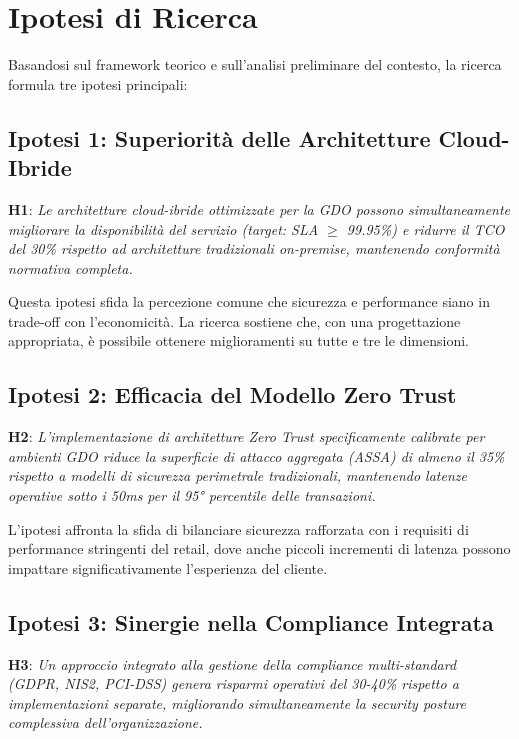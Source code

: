 \section{Ipotesi di Ricerca}

Basandosi sul framework teorico e sull'analisi preliminare del contesto, la ricerca formula tre ipotesi principali:

\subsection{Ipotesi 1: Superiorità delle Architetture Cloud-Ibride}

\textbf{H1}: \textit{Le architetture cloud-ibride ottimizzate per la GDO possono simultaneamente migliorare la disponibilità del servizio (target: SLA $\geq$ 99.95\%) e ridurre il TCO del 30\% rispetto ad architetture tradizionali on-premise, mantenendo conformità normativa completa.}

Questa ipotesi sfida la percezione comune che sicurezza e performance siano in trade-off con l'economicità. La ricerca sostiene che, con una progettazione appropriata, è possibile ottenere miglioramenti su tutte e tre le dimensioni.

\subsection{Ipotesi 2: Efficacia del Modello Zero Trust}

\textbf{H2}: \textit{L'implementazione di architetture Zero Trust specificamente calibrate per ambienti GDO riduce la superficie di attacco aggregata (ASSA) di almeno il 35\% rispetto a modelli di sicurezza perimetrale tradizionali, mantenendo latenze operative sotto i 50ms per il 95° percentile delle transazioni.}

L'ipotesi affronta la sfida di bilanciare sicurezza rafforzata con i requisiti di performance stringenti del retail, dove anche piccoli incrementi di latenza possono impattare significativamente l'esperienza del cliente.

\subsection{Ipotesi 3: Sinergie nella Compliance Integrata}

\textbf{H3}: \textit{Un approccio integrato alla gestione della compliance multi-standard (GDPR, NIS2, PCI-DSS) genera risparmi operativi del 30-40\% rispetto a implementazioni separate, migliorando simultaneamente la security posture complessiva dell'organizzazione.}

